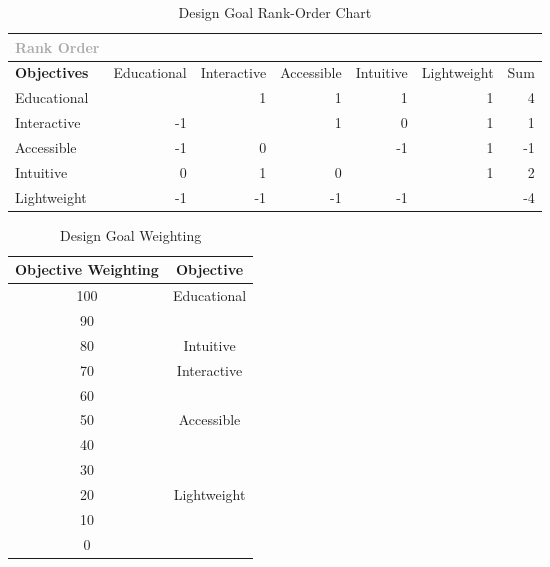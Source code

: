 \documentclass[conference]{IEEEtran}
\begin{document}
   \begin{table}[H]
     \centering
     \begin{tabular}{| l | r | r | r | r | r | r |}
       \hline
       \textcolor{darkgray}{Rank Order} & \cellcolor{black} & \cellcolor{black} & \cellcolor{black} & \cellcolor{black} & \cellcolor{black} & \cellcolor{black} \\
       \hline
       \textbf{Objectives} & Educational & Interactive & Accessible & Intuitive & Lightweight & Sum\\
       \hline
       Educational & \cellcolor{gray} & 1 & 1 & 1 & 1 & 4\\
       \hline
       Interactive & -1 & \cellcolor{gray} & 1 & 0 & 1 & 1\\
       \hline
       Accessible & -1 & 0 & \cellcolor{gray} & -1 & 1 & -1\\
       \hline
       Intuitive & 0 & 1 & 0 & \cellcolor{gray} & 1 & 2\\
       \hline
       Lightweight & -1 & -1 & -1 & -1 & \cellcolor{gray} & -4\\
       \hline
     \end{tabular}
     \caption{Design Goal Rank-Order Chart}
     \label{table:1}
   \end{table}

   \begin{table}[H]
     \centering
     \begin{tabular}{| c | c |}
       \hline
       \textbf{Objective Weighting} & \textbf{Objective} \\
       \hline
       \cellcolor{red!40} 100 & Educational\\
       \hline
       \cellcolor{red!40} 90 & \\
       \hline
       \cellcolor{red!40} 80 & Intuitive\\
       \hline
       \cellcolor{red!40} 70 & Interactive\\
       \hline
       \cellcolor{yellow!40} 60 & \\
       \hline
       \cellcolor{yellow!40} 50 & Accessible\\
       \hline
       \cellcolor{yellow!40} 40 & \\
       \hline
       \cellcolor{yellow!40} 30 & \\
       \hline
       \cellcolor{green!40} 20 & Lightweight\\
       \hline
       \cellcolor{green!40} 10 & \\
       \hline
       \cellcolor{green!40} 0 & \\
       \hline
     \end{tabular}
     \caption{Design Goal Weighting}
     \label{table:2}
   \end{table}
\end{document}
